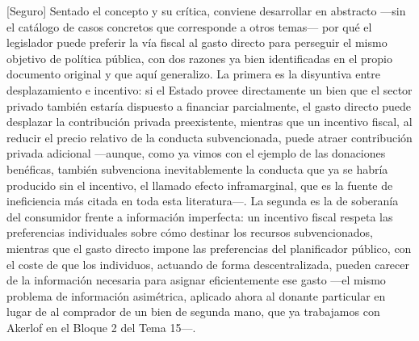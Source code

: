 \documentclass[10pt,a4paper]{article}
\begin{document}
[Seguro] Sentado el concepto y su crítica, conviene desarrollar en abstracto —sin el catálogo de casos concretos que corresponde a otros temas— por qué el legislador puede preferir la vía fiscal al gasto directo para perseguir el mismo objetivo de política pública, con dos razones ya bien identificadas en el propio documento original y que aquí generalizo. La primera es la disyuntiva entre desplazamiento e incentivo: si el Estado provee directamente un bien que el sector privado también estaría dispuesto a financiar parcialmente, el gasto directo puede desplazar la contribución privada preexistente, mientras que un incentivo fiscal, al reducir el precio relativo de la conducta subvencionada, puede atraer contribución privada adicional —aunque, como ya vimos con el ejemplo de las donaciones benéficas, también subvenciona inevitablemente la conducta que ya se habría producido sin el incentivo, el llamado efecto inframarginal, que es la fuente de ineficiencia más citada en toda esta literatura—. La segunda es la de soberanía del consumidor frente a información imperfecta: un incentivo fiscal respeta las preferencias individuales sobre cómo destinar los recursos subvencionados, mientras que el gasto directo impone las preferencias del planificador público, con el coste de que los individuos, actuando de forma descentralizada, pueden carecer de la información necesaria para asignar eficientemente ese gasto —el mismo problema de información asimétrica, aplicado ahora al donante particular en lugar de al comprador de un bien de segunda mano, que ya trabajamos con Akerlof en el Bloque 2 del Tema 15—.
\end{document}
